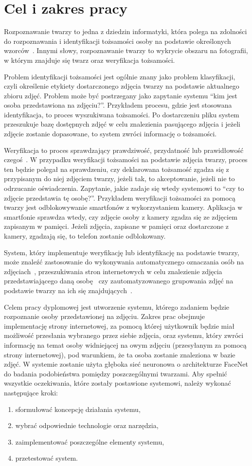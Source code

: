 \chapter{Cel i zakres pracy}

Rozpoznawanie twarzy to jedna z dziedzin informatyki, która polega na zdolności
do rozpoznawania i identyfikacji tożsamości osoby na podstawie określonych wzorców~\cite{william2019face}.
Innymi słowy, rozpoznawanie twarzy to wykrycie obszaru na fotografii,
w którym znajduje się twarz oraz weryfikacja tożsamości.

Problem identyfikacji tożsamości jest ogólnie znany jako problem klasyfikacji,
czyli określenie etykiety dostarczonego zdjęcia twarzy na podstawie aktualnego zbioru zdjęć.
Problem może być postrzegany jako zapytanie systemu ``kim jest osoba przedstawiona na zdjęciu?''.
Przykładem procesu, gdzie jest stosowana identyfikacja, to proces wyszukiwana tożsamości.
Po dostarczeniu pliku system przeszukuje bazę dostępnych zdjęć w celu znalezienia pasującego zdjęcia
i jeżeli zdjęcie zostanie dopasowane, to system zwróci informację o tożsamości.

Weryfikacja to proces sprawdzający prawdziwość, przydatność lub prawidłowość czegoś~\cite{sjp_pwn_1996}.
W przypadku weryfikacji tożsamości na podstawie zdjęcia twarzy, proces ten będzie polegał na sprawdzeniu,
czy deklarowana tożsamość zgadza się z przypisanym do niej zdjęciem twarzy, jeżeli tak,
to akceptowanie, jeżeli nie to odrzucanie oświadczenia.
Zapytanie, jakie zadaje się wtedy systemowi to ``czy to zdjęcie przedstawia tę osobę?''.
Przykładem weryfikacji tożsamości za pomocą twarzy jest odblokowywanie smartfonów z wykorzystaniem kamery.
Aplikacja w smartfonie sprawdza wtedy, czy zdjęcie osoby z kamery zgadza się ze zdjęciem zapisanym w pamięci.
Jeżeli zdjęcia, zapisane w pamięci oraz dostarczone z kamery, zgadzają się, to telefon zostanie odblokowany.

System, który implementuje weryfikację lub identyfikację na podstawie twarzy,
może znaleźć zastosowanie do wykonywania automatycznego oznaczania osób na zdjęciach~\cite{facebook-aut-tag},
przeszukiwania stron internetowych w celu znalezienie zdjęcia przedstawiającego daną osobę~\cite{pimeyes}
czy zautomatyzowanego grupowania zdjęć na podstawie twarzy na ich się znajdujących~\cite{google-photos_groupby}.

Celem pracy dyplomowej jest utworzenie systemu, którego zadaniem będzie rozpoznanie osoby przedstawionej na zdjęciu.
Zakres prac obejmuje implementację strony internetowej,
za pomocą której użytkownik będzie miał możliwość przesłania wybranego przez siebie zdjęcia,
oraz systemu, który zwróci informację na temat osoby widniejącej na owym zdjęciu
(przesyłanym za pomocą strony internetowej),
pod warunkiem, że ta osoba zostanie znaleziona w bazie zdjęć.
W systemie zostanie użyta głęboka sieć neuronowa o architekturze FaceNet do badania
podobieństwa pomiędzy poszczególnymi twarzami.
Aby spełnić wszystkie oczekiwania, które zostały postawione systemowi, należy wykonać następujące kroki:

\begin{enumerate}
    \item sformułować koncepcję działania systemu,
    \item wybrać odpowiednie technologie oraz narzędzia,
    \item zaimplementować poszczególne elementy systemu,
    \item przetestować system.
\end{enumerate}

